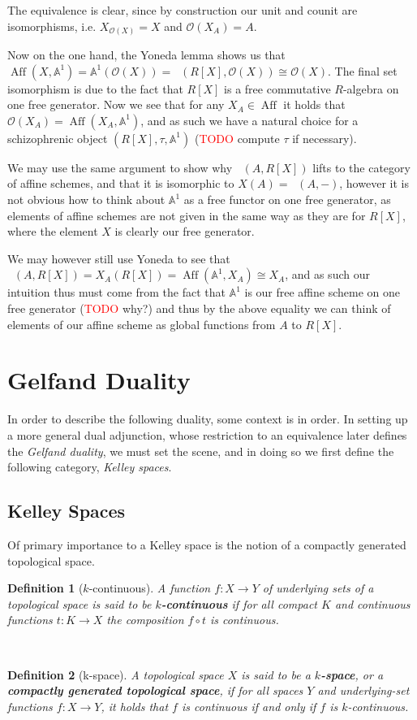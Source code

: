 \documentclass[12pt,a4paper]{article}
\newtheorem{definition}{Definition}[section] %
\DeclareMathOperator{\CAlg}{CAlg_R}
\DeclareMathOperator{\Aff}{Aff}
\begin{document}
The equivalence is clear, since by construction  our unit and counit are  isomorphisms, i.e. $X_{\mathcal{O}(X)} =X$ and $\mathcal{O}(X_A) = A$. 


Now on the one hand,  the Yoneda lemma shows us that   $\Aff(X, \mathbb{A}^1) = \mathbb{A}^1(\mathcal{O}(X)) = \CAlg(R[X], \mathcal{O}(X)) \cong \mathcal{O}(X)$. The final set isomorphism is due to the fact that $R[X]$ is a free commutative $R$-algebra on one free generator. Now we see that for any $X_A \in \Aff$ it holds that $\mathcal{O}(X_A) = \Aff(X_A, \mathbb{A}^1)$, and as such we have a natural choice for a schizophrenic object $(R[X], \tau, \mathbb{A}^1 )$ (\textcolor{red}{TODO} compute $\tau$ if necessary). 


We may use the same argument to show why $\CAlg(A, R[X])$ lifts to the category of affine schemes, and that it is isomorphic to $X(A) = \CAlg(A, -)$, however it is not obvious how to think about $\mathbb{A}^1$ as a free functor on one free generator, as elements of affine schemes are not given in the same way as they are for $R[X]$, where the element $X$ is clearly our free generator. 

We may however still use Yoneda to see that $\CAlg(A, R[X]) = X_A(R[X]) = \Aff(\mathbb{A}^1, X_A) \cong X_A$, and as such our intuition thus must come from the fact that $\mathbb{A}^1$ is our free affine scheme on one free generator (\textcolor{red}{TODO} why?) and  thus by the above equality we can think of elements of our affine scheme  as global functions from $A$ to $R[X]$. 
%

\section{Gelfand Duality}
In order to describe the following duality, some context is in order. In setting up a more general dual adjunction, whose restriction to an equivalence later defines the \emph{Gelfand duality}, we must set the scene, and in doing so we first define the following category, \emph{Kelley spaces}.
\subsection{Kelley Spaces}
Of primary importance to a Kelley space is the notion of a compactly generated topological space.
\\
\begin{definition}[$k$-continuous]
	A function $f: X \to Y$ of underlying sets of a topological space is said to be \textbf{$k$-continuous} if for all compact $K$ and continuous functions $t: K \to X$ the composition $f \circ t$ is continuous. 
\end{definition}
\
\begin{definition}[k-space]
A topological space $X$ is said to be a \textbf{$k$-space}, or a \textbf{compactly generated topological space}, if for all spaces $Y$ and underlying-set functions $f: X \to Y$, it holds that $f$ is continuous if and only if $f$ is $k$-continuous.	
\end{definition}
\
\end{document}
